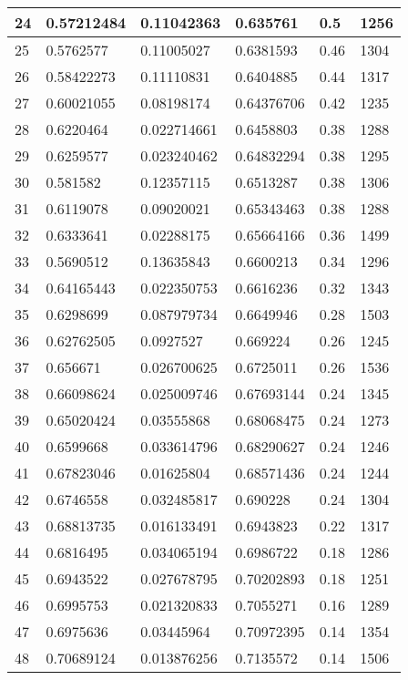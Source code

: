 \begin{longtable}{|l|l|l|l|l|l|}
24 & 0.57212484 & 0.11042363 & 0.635761 & 0.5 & 1256 \\ \hline 
25 & 0.5762577 & 0.11005027 & 0.6381593 & 0.46 & 1304 \\ \hline 
26 & 0.58422273 & 0.11110831 & 0.6404885 & 0.44 & 1317 \\ \hline 
27 & 0.60021055 & 0.08198174 & 0.64376706 & 0.42 & 1235 \\ \hline 
28 & 0.6220464 & 0.022714661 & 0.6458803 & 0.38 & 1288 \\ \hline 
29 & 0.6259577 & 0.023240462 & 0.64832294 & 0.38 & 1295 \\ \hline 
30 & 0.581582 & 0.12357115 & 0.6513287 & 0.38 & 1306 \\ \hline 
31 & 0.6119078 & 0.09020021 & 0.65343463 & 0.38 & 1288 \\ \hline 
32 & 0.6333641 & 0.02288175 & 0.65664166 & 0.36 & 1499 \\ \hline 
33 & 0.5690512 & 0.13635843 & 0.6600213 & 0.34 & 1296 \\ \hline 
34 & 0.64165443 & 0.022350753 & 0.6616236 & 0.32 & 1343 \\ \hline 
35 & 0.6298699 & 0.087979734 & 0.6649946 & 0.28 & 1503 \\ \hline 
36 & 0.62762505 & 0.0927527 & 0.669224 & 0.26 & 1245 \\ \hline 
37 & 0.656671 & 0.026700625 & 0.6725011 & 0.26 & 1536 \\ \hline 
38 & 0.66098624 & 0.025009746 & 0.67693144 & 0.24 & 1345 \\ \hline 
39 & 0.65020424 & 0.03555868 & 0.68068475 & 0.24 & 1273 \\ \hline 
40 & 0.6599668 & 0.033614796 & 0.68290627 & 0.24 & 1246 \\ \hline 
41 & 0.67823046 & 0.01625804 & 0.68571436 & 0.24 & 1244 \\ \hline 
42 & 0.6746558 & 0.032485817 & 0.690228 & 0.24 & 1304 \\ \hline 
43 & 0.68813735 & 0.016133491 & 0.6943823 & 0.22 & 1317 \\ \hline 
44 & 0.6816495 & 0.034065194 & 0.6986722 & 0.18 & 1286 \\ \hline 
45 & 0.6943522 & 0.027678795 & 0.70202893 & 0.18 & 1251 \\ \hline 
46 & 0.6995753 & 0.021320833 & 0.7055271 & 0.16 & 1289 \\ \hline 
47 & 0.6975636 & 0.03445964 & 0.70972395 & 0.14 & 1354 \\ \hline 
48 & 0.70689124 & 0.013876256 & 0.7135572 & 0.14 & 1506 \\ \hline 

\end{longtable}
